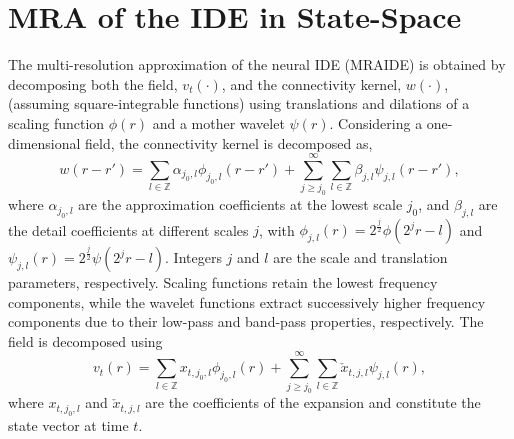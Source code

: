 \documentclass[11pt,draftcls,onecolumn,peerreview]{IEEEtran}
\begin{document}
\section{MRA of the IDE in State-Space}
The multi-resolution approximation \cite{Mallat1989a} of the neural IDE (MRAIDE) is obtained by decomposing both the field, $v_t(\cdot)$, and the connectivity kernel, $w(\cdot)$, (assuming square-integrable functions) using translations and dilations of a scaling function $\phi(r)$ and a mother wavelet $\psi(r)$. Considering a one-dimensional field, the connectivity kernel is decomposed as,
\begin{equation}
 w\left(r-r'\right)=\sum_{l \in \mathbb{Z}}\alpha_{j_0,l}\phi_{j_0,l}\left(r-r'\right)+\sum_{j\geq j_0}^{\infty} \sum_{l \in \mathbb{Z}}\beta_{j,l}\psi_{j,l}\left(r-r'\right), 
\label{eq:KernelExpansion}
\end{equation}
where $\alpha_{j_0,l}$ are the approximation coefficients at the lowest scale $j_0$, and $\beta_{j,l}$ are the detail coefficients at different scales $j$, with $\phi_{j,l}\left(r\right)=2^{\frac{j}{2}}\phi\left(2^jr-l\right) $ and $\psi_{j,l}\left(r\right)=2^{\frac{j}{2}}\psi\left(2^jr-l\right)$. Integers $j$ and $l$ are the scale and translation parameters, respectively. Scaling functions retain the lowest frequency components, while the wavelet functions extract successively higher frequency components due to their low-pass and band-pass properties, respectively. The field is decomposed using
\begin{equation}
 v_t\left(r\right)=\sum_{l \in \mathbb{Z}}x_{t,j_{0},l}\phi_{j_{0},l}\left(r\right)+\sum_{j\geq j_0}^{\infty} \sum_{l \in \mathbb{Z}} \check{x}_{t,j,l}\psi_{j,l}\left(r\right),
\label{eq:FieldExpansion}
\end{equation}
where $x_{t,j_{0},l}$ and $\check{x}_{t,j,l} $ are the coefficients of the expansion and constitute the state vector at time $t$. 
\end{document}
